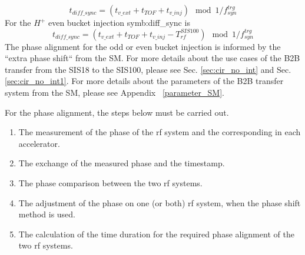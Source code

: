 \begin{equation}
	t_{\mathit{diff\_sync}}=(t_{\mathit{v\_ext}}+t_{\mathit{TOF}}+t_{\mathit{v\_inj}}) \mod 1/f_\mathit{syn}^\mathit{trg}
\end{equation}
For the $H^{+}$ even bucket injection \gls{symb:diff_sync} is
\begin{equation}
t_{\mathit{diff\_sync}}=(t_{\mathit{v\_ext}}+t_{\mathit{TOF}}+t_{\mathit{v\_inj}}- T_{\mathit{rf}}^{\mathit{SIS100}}) \mod 1/f_\mathit{syn}^\mathit{trg} 
\end{equation}
The phase alignment for the odd or even bucket injection is informed by the ``extra phase shift`` from the SM. For more details about the use cases of the B2B transfer from the SIS18 to the SIS100, please see Sec. \ref{sec:cir_no_int} and Sec. \ref{sec:cir_no_int1}. For more details about the parameters of the B2B transfer system from the SM, please see Appendix ~\ref{parameter_SM}.  

For the phase alignment, the steps below must be carried out. 
\begin{enumerate}
\item The measurement of the phase of the rf system and the corresponding  in each accelerator.
\item The exchange of the measured phase and the timestamp.
\item The phase comparison between the two rf systems.
\item The adjustment of the phase on one (or both) rf system, when the phase shift method is used. 
\item The calculation of the time duration for the required phase alignment of the two rf systems.
\end{enumerate}

